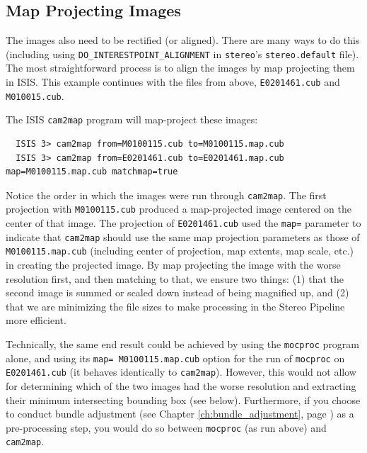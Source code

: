 \subsection{Map Projecting Images}

The images also need to be rectified (or aligned).  There are many
ways to do this (including using \texttt{DO\_INTERESTPOINT\_ALIGNMENT}
in \texttt{stereo}'s \texttt{stereo.default} file).  The most
straightforward process is to align the images by map projecting
them in \ac{ISIS}. This example continues with the files from above,
\texttt{E0201461.cub} and \texttt{M010015.cub}.

The \ac{ISIS} \texttt{cam2map} program will map-project these images:

\begin{verbatim}
  ISIS 3> cam2map from=M0100115.cub to=M0100115.map.cub
  ISIS 3> cam2map from=E0201461.cub to=E0201461.map.cub map=M0100115.map.cub matchmap=true
\end{verbatim}

Notice the order in which the images were run through
\texttt{cam2map}.  The first projection with \texttt{M0100115.cub}
produced a map-projected image centered on the center of that image.
The projection of \texttt{E0201461.cub} used the \texttt{map=}
parameter to indicate that \texttt{cam2map} should use the same map
projection parameters as those of \texttt{M0100115.map.cub} (including
center of projection, map extents, map scale, etc.) in creating the
projected image.  By map projecting the image with the worse
resolution first, and then matching to that, we ensure two things: (1)
that the second image is summed or scaled down instead of being
magnified up, and (2) that we are minimizing the file sizes to make
processing in the Stereo Pipeline more efficient.

Technically, the same end result could be achieved by using the
\texttt{mocproc} program alone, and using its \texttt{map=
M0100115.map.cub} option for the run of \texttt{mocproc} on
\texttt{E0201461.cub} (it behaves identically to \texttt{cam2map}).
However, this would not allow for determining which of the two
images had the worse resolution and extracting their minimum
intersecting bounding box (see below).  Furthermore, if you choose
to conduct bundle adjustment (see Chapter \ref{ch:bundle_adjustment},
page \pageref{ch:bundle_adjustment}) as a pre-processing step, you
would do so between \texttt{mocproc} (as run above) and \texttt{cam2map}.

